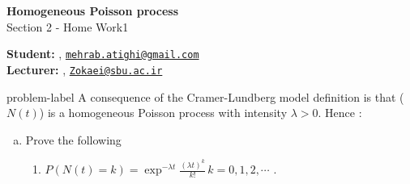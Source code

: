 	






		\begin{Large}
		\textsf{\textbf{Homogeneous Poisson process}}\\
		Section 2 - Home Work1
	\end{Large}
	
	\vspace{1ex}
	
	\textsf{\textbf{Student:}} , \href{mailto:mehrab.atighi@gmail.com}{\texttt{mehrab.atighi@gmail.com}}\\
	\textsf{\textbf{Lecturer:}} , \href{mailto:Zokaei@sbu.ac.ir}{\texttt{Zokaei@sbu.ac.ir}}
	
	
	\vspace{2ex}
	
	\begin{problem}{}{problem-label}
		A consequence of the Cramer-Lundberg model definition is that ($N(t)$) is a homogeneous Poisson process with intensity $\lambda > 0$. Hence \cite{Embrechts.etal1997}:
		
		\begin{enumerate}[(a)]
			\item Prove the following
			\begin{enumerate}[label = (\roman*)]
				\item $P(N(t) =k) = \exp^{-\lambda t} \frac{(\lambda t)^k}{k!} \, k = 0,1,2,\cdots$ .
			\end{enumerate}
		\end{enumerate}
	\end{problem}
	
